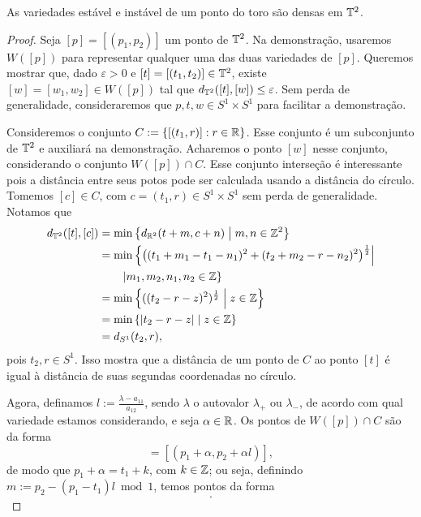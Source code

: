 \begin{proposition}
As variedades estável e instável de um ponto do toro são densas em $\mathbb{T}^2$.	\end{proposition}
\begin{proof}
Seja $[p]=[(p_1,p_2)]$ um ponto de $\mathbb{T}^2$. Na demonstração, usaremos $W([p])$ para representar qualquer uma das duas variedades de $[p]$. Queremos mostrar que, dado $\varepsilon > 0$ e $[t]=[(t_1,t_2)] \in \mathbb{T}^2$, existe $[w]=[w_1,w_2] \in W([p])$ tal que $d_{\mathbb{T}^2}([t],[w]) \leq \varepsilon$. Sem perda de generalidade, consideraremos que $p,t,w \in S^1 \times S^1$ para facilitar a demonstração.

Consideremos o conjunto $C := \{[(t_1,r)] : r \in \mathbb{R} \}$. Esse conjunto é um subconjunto de $\mathbb{T}^2$ e auxiliará na demonstração. Acharemos o ponto $[w]$ nesse conjunto, considerando o conjunto $W([p]) \cap C$. Esse conjunto interseção é interessante pois a distância entre seus potos pode ser calculada usando a distância do círculo. Tomemos $[c] \in C$, com $c=(t_1,r) \in S^1 \times S^1$ sem perda de generalidade. Notamos que
	\begin{align*}
		d_{\mathbb{T}^2}([t],[c])& = \min\left\{ d_{\mathbb{R}^2}(t+m,c+n) \;\middle\vert\; m,n \in \mathbb{Z}^2 \right\} \\
			& = \min \left\{ \big((t_1+m_1-t_1-n_1)^2 + (t_2+m_2-r-n_2)^2 \big)^{\frac{1}{2}} \right| \\
			&\qquad \left| m_1,m_2,n_1,n_2 \in \mathbb{Z} \right\} \\
			& = \min\left\{ ((t_2-r-z)^2)^{\frac{1}{2}} \;\middle\vert\; z \in \mathbb{Z} \right\} \\
			& = \min\left\{ \left\vert{t_2-r-z}\right\vert \;\middle\vert\; z \in \mathbb{Z} \right\} \\
			& = d_{S^1}(t_2,r),
	\end{align*}
pois $t_2, r \in S^1$. Isso mostra que a distância de um ponto de $C$ ao ponto $[t]$ é igual à distância de suas segundas coordenadas no círculo.

Agora, definamos $l := \frac{\lambda - a_{11}}{a_{12}}$, sendo $\lambda$ o autovalor $\lambda_+$ ou $\lambda_-$, de acordo com qual variedade estamos considerando, e seja $\alpha \in \mathbb{R}$. Os pontos de $W([p]) \cap C$ são da forma
	\begin{equation*}
	[p + \alpha v_\lambda] = [(p_1 + \alpha, p_2 + \alpha l)],
	\end{equation*}
de modo que $p_1 + \alpha = t_1 + k$, com $k \in \mathbb{Z}$; ou seja, definindo $m := p_2 - (p_1 - t_1)l \bmod 1$, temos pontos da forma
	\begin{equation*}
	[(t_1,m + kl)].
	\end{equation*}


\end{proof}
